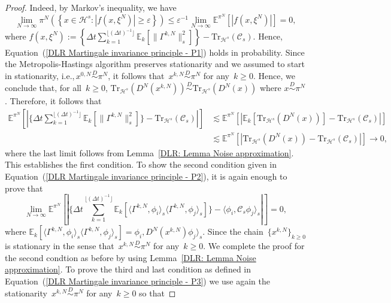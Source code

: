 \begin{proof}
  Indeed, by Markov's inequality, we have
  \begin{equation*}
    \lim_{N \to \infty} \pi^N \left( \left\{ x \in \mathcal{H}^s : \left| f(x, \xi^N)  \right| \geq \varepsilon \right\} \right) \leq \varepsilon^{-1} \lim_{N \to \infty} \mathbb{E}^{\pi^N} \left[ \left| f(x, \xi^N) \right| \right] = 0,
  \end{equation*}
  where $f(x, \xi^N) := \left\{ \Delta t \sum_{k=1}^{\lfloor (\Delta t)^{-1} \rfloor} \mathbb{E}_k[\| \Gamma^{k,N} \|_s^2]  \right\} - \text{Tr}_{\mathcal{H}^s}(\mathcal{C}_s)$. Hence, Equation~(\ref{DLR Martingale invariance principle - P1}) holds in probability. Since the Metropolis-Hastings algorithm preserves stationarity and we assumed to start in stationarity, i.e.,\,$x^{0,N} \stackrel{D}{\sim} \pi^N$, it follows that~$x^{k,N}\stackrel{D}{\sim} \pi^N$ for any~$k \geq 0$. Hence, we conclude that, for all~$k \geq 0$, $\text{Tr}_{\mathcal{H}^s} (D^N(x^{k,N})) \stackrel{D}{\sim} \text{Tr}_{\mathcal{H}^s} (D^N(x))$ where $x \stackrel{D}{\sim} \pi^N$. Therefore, it follows that
  \begin{align*}
    \mathbb{E}^{\pi^N} [ | \{ \Delta t \sum_{k=1}^{\lfloor (\Delta t)^{-1} \rfloor} \mathbb{E}_k[\| \Gamma^{k,N} \|_s^2]  \} - \text{Tr}_{\mathcal{H}^s}(\mathcal{C}_s) | ] & \lesssim \mathbb{E}^{\pi^N} \left[ \left|  \mathbb{E}_k[\text{Tr}_{\mathcal{H}^s} (D^N(x))] - \text{Tr}_{\mathcal{H}^s}(\mathcal{C}_s) \right| \right] \\
   &  \lesssim \mathbb{E}^{\pi^N} \left[ \left| \text{Tr}_{\mathcal{H}^s} (D^N(x)) - \text{Tr}_{\mathcal{H}^s}(\mathcal{C}_s) \right| \right]  \to 0,
  \end{align*}
  where the last limit follows from Lemma~\ref{DLR: Lemma Noise approximation}. This establishes the first condition. To show the second condition given in Equation~(\ref{DLR Martingale invariance principle  - P2}), it is again enough to prove that
  \begin{equation*}
   \lim_{N \to \infty} \mathbb{E}^{\pi^N} [| \{ \Delta t \sum_{k=1}^{\lfloor (\Delta t)^{-1} \rfloor} \mathbb{E}_k[\langle \Gamma^{k,N}, \phi_i \rangle_s \langle \Gamma^{k,N}, \phi_j \rangle_s ] \} - \langle \phi_i , \mathcal{C}_s \phi_j \rangle_s |  ] = 0,
  \end{equation*}
  where $\mathbb{E}_k[\langle \Gamma^{k,N}, \phi_i \rangle_s \langle \Gamma^{k,N}, \phi_j \rangle_s ] = \phi_i, D^N(x^{k,N}) \phi_j \rangle_s$. Since the chain~$\{x^{k,N}\}_{k \geq 0}$ is stationary in the sense that~$x^{k,N}\stackrel{D}{\sim} \pi^N$ for any~$k \geq 0$. We complete the proof for the second condtion as before by using Lemma~\ref{DLR: Lemma Noise approximation}. To prove the third and last condition as defined in Equation~(\ref{DLR Martingale invariance principle  - P3}) we use again the stationarity~$x^{k,N}\stackrel{D}{\sim} \pi^N$ for any~$k \geq 0$ so that

\end{proof}
